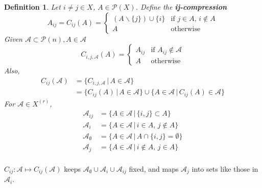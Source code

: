\documentclass[a4paper]{article}
\newtheorem*{definition}{Definition}
\begin{document}
\begin{definition}
	Let $i \neq j \in X$, $A \in \mathcal{P}(X)$. Define the \textbf{ij-compression} $$A_{ij} = C_{ij}(A) = \begin{cases}
	(A\backslash \{j\}) \cup \{i\} & \text{if } j \in A,\, i \not\in A \\
	A & \text{otherwise}
	\end{cases}$$
	Given $\mathcal{A} \subset \mathcal{P}(n), A \in \mathcal{A}$ $$C_{i,j,\mathcal{A}}(A) = \begin{cases}
	A_{ij} & \text{if } A_{ij} \not\in \mathcal{A} \\
	A & \text{otherwise}
	\end{cases}$$
	Also,
	\begin{align*}
	C_{ij}(\mathcal{A}) &= \{C_{i,j,\mathcal{A}} \,|\, A \in \mathcal{A} \} \\
	&= \{C_{ij}(A) \,|\, A \in \mathcal{A}\} \cup \{A \in \mathcal{A} \,|\, C_{ij}(A) \in \mathcal{A}\}
	\end{align*}
	For $\mathcal{A} \in X^{(r)}$,
	\begin{align*}
	\mathcal{A}_{ij} &= \{A \in \mathcal{A} \,|\, \{i,j\} \subset A \} \\
	\mathcal{A}_i &= \{A \in \mathcal{A} \,|\, i \in A,\, j \not\in A \} \\
	\mathcal{A}_\emptyset &= \{A \in \mathcal{A} \,|\, A \cap \{i, j\} = \emptyset \} \\
	\mathcal{A}_j &= \{A \in \mathcal{A} \,|\, i \not\in A,\, j \in A \} \\
	\end{align*}
\end{definition}
$C_{ij}: \mathcal{A} \mapsto C_{ij}(\mathcal{A})$ keeps $\mathcal{A}_\emptyset \cup \mathcal{A}_i \cup \mathcal{A}_{ij}$ fixed, and maps $\mathcal{A}_j$ into sets like those in $\mathcal{A}_i$.
\end{document}
